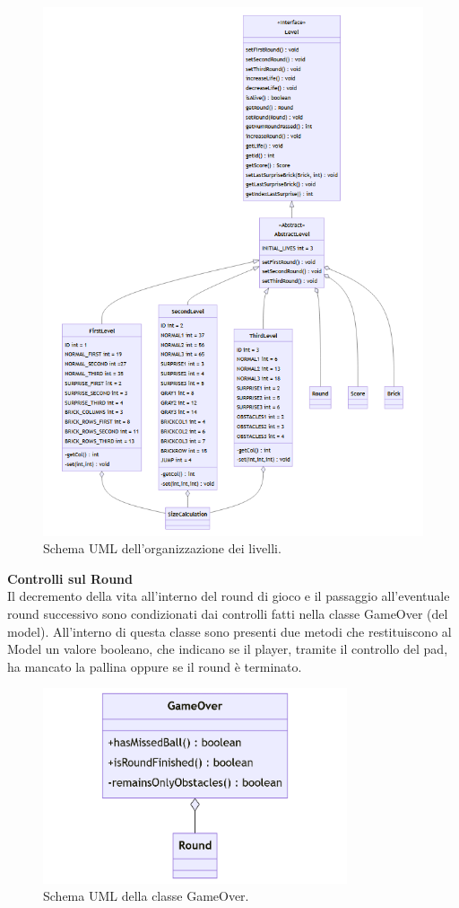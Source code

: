 \documentclass[a4paper,12pt]{report}
\begin{document}
\begin{figure}[H]
    \centering
    \includegraphics[scale=0.9]{images/Levels.png}
    \caption{Schema UML dell'organizzazione dei livelli.}
    \label{images:Levels}
\end{figure}
\newpage
\noindent
\textbf{Controlli sul Round}\\
Il decremento della vita all'interno del round di gioco e il passaggio all'eventuale round successivo sono
condizionati dai controlli fatti nella classe GameOver (del model). All'interno di questa classe sono presenti due metodi che restituiscono al Model
un valore booleano, che indicano se il player, tramite il controllo del pad, ha mancato la pallina oppure se il round è terminato.
\begin{figure}[H]
    \centering
    \includegraphics[width=0.8\textwidth]{images/GameOver.png}
    \caption{Schema UML della classe GameOver.}
\end{figure}
\end{document}

